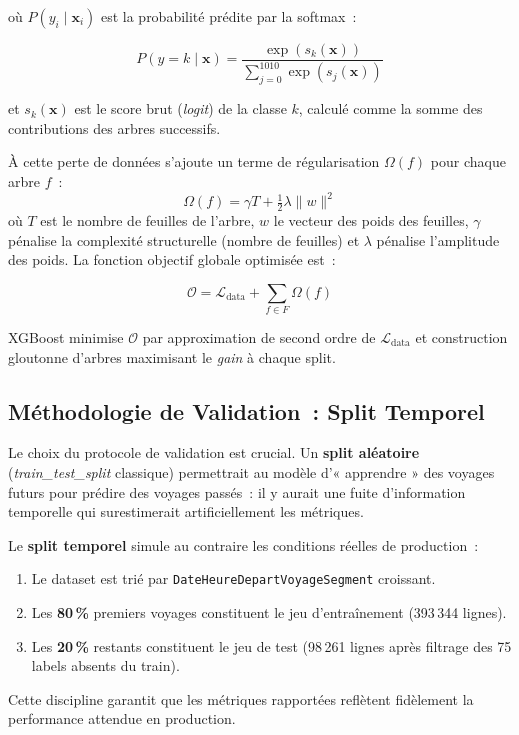 \documentclass[11pt, a4paper]{article}
\begin{document}
où $P(y_i \mid \mathbf{x}_i)$ est la probabilité prédite par la
softmax~:

\[
P(y = k \mid \mathbf{x}) =
  \frac{\exp(s_k(\mathbf{x}))}
       {\displaystyle\sum_{j=0}^{1010} \exp(s_j(\mathbf{x}))}
\]

et $s_k(\mathbf{x})$ est le score brut (\textit{logit}) de la classe $k$,
calculé comme la somme des contributions des arbres successifs.

À cette perte de données s'ajoute un terme de régularisation
$\Omega(f)$ pour chaque arbre $f$~:
\[
\Omega(f) = \gamma T + \tfrac{1}{2}\lambda \|w\|^2
\]
où $T$ est le nombre de feuilles de l'arbre, $w$ le vecteur des poids
des feuilles, $\gamma$ pénalise la complexité structurelle (nombre de
feuilles) et $\lambda$ pénalise l'amplitude des poids.
La fonction objectif globale optimisée est~:

\[
\mathcal{O} = \mathcal{L}_{\text{data}} + \sum_{f \in F} \Omega(f)
\]

XGBoost minimise $\mathcal{O}$ par approximation de second ordre de
$\mathcal{L}_{\text{data}}$ et construction gloutonne d'arbres
maximisant le \textit{gain} à chaque split.

\subsection{Méthodologie de Validation~: Split Temporel}

Le choix du protocole de validation est crucial. Un \textbf{split
aléatoire} (\textit{train\_test\_split} classique) permettrait au
modèle d'« apprendre » des voyages futurs pour prédire des voyages
passés~: il y aurait une fuite d'information temporelle qui
surestimerait artificiellement les métriques.

Le \textbf{split temporel} simule au contraire les conditions réelles
de production~:
\begin{enumerate}
\item Le dataset est trié par \texttt{DateHeureDepartVoyageSegment}
    croissant.
\item Les \textbf{80\,\%} premiers voyages constituent le jeu
    d'entraînement (393\,344 lignes).
\item Les \textbf{20\,\%} restants constituent le jeu de test
    (98\,261 lignes après filtrage des 75 labels absents du train).
\end{enumerate}

Cette discipline garantit que les métriques rapportées reflètent
fidèlement la performance attendue en production.
\end{document}
